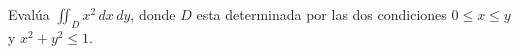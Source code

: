 Evalúa \(\displaystyle\iint_D x^2 \, dx \, dy\), donde \( D \) esta determinada por las dos condiciones \( 0 \leq x \leq y \) y \( x^2 + y^2 \leq 1 \).
